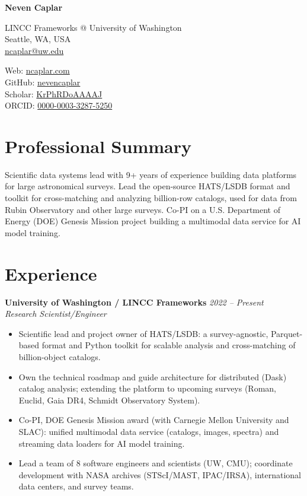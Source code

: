 \documentclass[11pt,letterpaper]{article}
\def\name{\textbf{Neven Caplar}}
\begin{document}
{\huge \name}

\bigskip

\begin{minipage}[t]{0.63\textwidth}
  LINCC Frameworks @ University of Washington \\
  Seattle, WA, USA \\
  \href{mailto:ncaplar@uw.edu}{ncaplar@uw.edu}
\end{minipage}
\begin{minipage}[t]{0.35\textwidth}
  Web: \href{https://www.ncaplar.com}{ncaplar.com} \\
  GitHub: \href{https://github.com/nevencaplar}{nevencaplar} \\
  Scholar: \href{https://scholar.google.com/citations?user=KrPhRDoAAAAJ}{KrPhRDoAAAAJ} \\
  ORCID: \href{https://orcid.org/0000-0003-3287-5250}{0000-0003-3287-5250}
\end{minipage}

\section*{Professional Summary}

Scientific data systems lead with 9+ years of experience building data platforms for large
astronomical surveys. Lead the open-source HATS/LSDB format and toolkit for cross-matching and
analyzing billion-row catalogs, used for data from Rubin Observatory and other large surveys.
Co-PI on a U.S. Department of Energy (DOE) Genesis Mission project building a multimodal data service for AI model training.

\section*{Experience}

\textbf{University of Washington / LINCC Frameworks} \hfill \textit{2022 -- Present} \\
\textit{Research Scientist/Engineer}

\begin{itemize}
  \item Scientific lead and project owner of HATS/LSDB: a survey-agnostic, Parquet-based format and
        Python toolkit for scalable analysis and cross-matching of billion-object catalogs.
  \item Own the technical roadmap and guide architecture for distributed (Dask) catalog analysis;
        extending the platform to upcoming surveys (Roman, Euclid, Gaia DR4, Schmidt Observatory System).
  \item Co-PI, DOE Genesis Mission award (with Carnegie Mellon University and SLAC): unified multimodal
        data service (catalogs, images, spectra) and streaming data loaders for AI model training.
  \item Lead a team of 8 software engineers and scientists (UW, CMU); coordinate development
        with NASA archives (STScI/MAST, IPAC/IRSA), international data centers, and survey teams.
\end{itemize}
\end{document}
